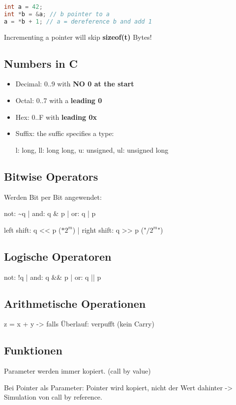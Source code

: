 \begin{multicols*}{4}
\begin{lstlisting}[language=c]
int a = 42;
int *b = &a; // b pointer to a
a = *b + 1; // a = dereference b and add 1
\end{lstlisting}
Incrementing a pointer will skip \textbf{sizeof(t)} Bytes!

\subsection{Numbers in C}
\begin{itemize}
    \item Decimal: 0..9 with \textbf{NO 0 at the start}
    \item Octal: 0..7 with a \textbf{leading 0}
    \item Hex: 0..F with \textbf{leading 0x}
    \item Suffix: the suffic specifies a type:

    l: long, ll: long long, u: unsigned, ul: unsigned long
\end{itemize}

\subsection{Bitwise Operators}
Werden Bit per Bit angewendet:

not: \~{}q | and: q \& p | or: q | p

left shift: q << p ($* 2^m$) | right shift: q >> p ("$/ 2^m$")
\subsection{Logische Operatoren}
not: !q | and: q \&\& p | or: q || p

\subsection{Arithmetische Operationen}
z = x + y -> falls Überlauf: verpufft (kein Carry)

\subsection{Funktionen}
Parameter werden immer kopiert. (call by value)\vspace{2pt}

Bei Pointer als Parameter: Pointer wird kopiert, nicht der Wert dahinter -> Simulation von call by reference.\vspace{2pt}


\end{multicols*}
